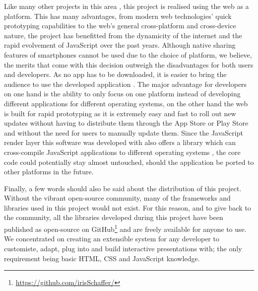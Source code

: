 Like many other projects in this area \cite{Bry:Backstage, Cheng:TreebasedOnlinePresentations, Esponda:ElectronicVotingOnTheFly, Inoue:RealTimeQuestionnaire, Teevan:MobileFeedbackDuringPresentation, Triglianos:InteractiveWebPresentationsImpress}, this project is realised using the web as a platform.
This has many advantages, from modern web technologies' quick prototyping capabilities to the web's general cross-platform and cross-device nature, the project has benefitted from the dynamicity of the internet and the rapid evolvement of JavaScript over the past years.
Although native sharing features of smartphones cannot be used due to the choice of platform, we believe, the merits that come with this decision outweigh the disadvantages for both users and developers. As no app has to be downloaded, it is easier to bring the audience to use the developed application \cite{Triglianos:InteractiveWebPresentationsImpress}. The major advantage for developers on one hand is the ability to only focus on one platform instead of developing different applications for different operating systems, on the other hand the web is built for rapid prototyping as it is extremely easy and fast to roll out new updates without having to distribute them through the App Store or Play Store and without the need for users to manually update them. Since the JavaScript render layer this software was developed with \cite{react} also offers a library which can cross-compile JavaScript applications to different operating systems \cite{react-native}, the core code could potentially stay almost untouched, should the application be ported to other platforms in the future.

Finally, a few words should also be said about the distribution of this project. Without the vibrant open-source community, many of the frameworks and libraries used in this project would not exist. For this reason, and to give back to the community, all the libraries developed during this project have been published as open-source on GitHub\footnote{\href{https://github.com/irisSchaffer?tab=repositories}{\textsf{https://github.com/irisSchaffer/}}} and are freely available for anyone to use. We concentrated on creating an extensible system for any developer to customiste, adapt, plug into and build interactive presentations with; the only requirement being basic HTML, CSS and JavaScript knowledge.

